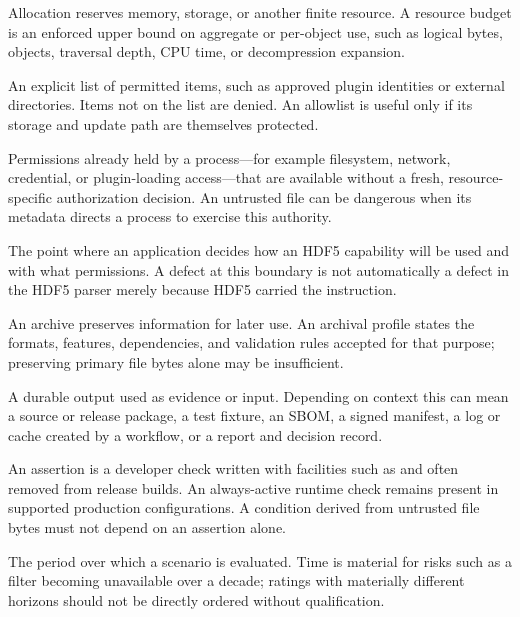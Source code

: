 \documentclass[../main.tex]{subfiles}
\begin{document}
\begin{description}[leftmargin=1.5em,style=nextline]
\item[Allocation / resource budget.]
Allocation reserves memory, storage, or another finite resource. A resource
budget is an enforced upper bound on aggregate or per-object use, such as
logical bytes, objects, traversal depth, CPU time, or decompression expansion.

\item[Allowlist.]
An explicit list of permitted items, such as approved plugin identities or
external directories. Items not on the list are denied. An allowlist is useful
only if its storage and update path are themselves protected.

\item[Ambient authority.]
Permissions already held by a process---for example filesystem, network,
credential, or plugin-loading access---that are available without a fresh,
resource-specific authorization decision. An untrusted file can be dangerous
when its metadata directs a process to exercise this authority.

\item[Application boundary.]
The point where an application decides how an HDF5 capability will be used and
with what permissions. A defect at this boundary is not automatically a defect
in the HDF5 parser merely because HDF5 carried the instruction.

\item[Archive / archival profile.]
An archive preserves information for later use. An archival profile states the
formats, features, dependencies, and validation rules accepted for that purpose;
preserving primary file bytes alone may be insufficient.

\item[Artifact.]
A durable output used as evidence or input. Depending on context this can mean a
source or release package, a test fixture, an SBOM, a signed manifest, a log or
cache created by a workflow, or a report and decision record.

\item[Assertion / always-active check.]
An assertion is a developer check written with facilities such as
 and often removed from release builds. An always-active
runtime check remains present in supported production configurations. A
condition derived from untrusted file bytes must not depend on an assertion
alone.

\item[Assessment horizon.]
The period over which a scenario is evaluated. Time is material for risks such
as a filter becoming unavailable over a decade; ratings with materially
different horizons should not be directly ordered without qualification.


\end{description}
\end{document}
